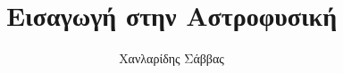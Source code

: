 \newcommand{\dbar}{{d\mkern-7mu\mathchar'26\mkern-2mu}} %



\title{Εισαγωγή στην Αστροφυσική}
\author{Χανλαρίδης Σάββας}


    \renewcommand{\contentsname}{Περιεχόμενα}
    \renewcommand{\listfigurename}{Λίστα Σχημάτων}
    \renewcommand{\listtablename}{Λίστα Πινάκων}
    \renewcommand{\chaptername}{Κεφάλαιο}
    \renewcommand{\appendixname}{Παράρτημα}
    \renewcommand{\bibname}{Βιβλιογραφία}
    
    \frontmatter  %
    


    
